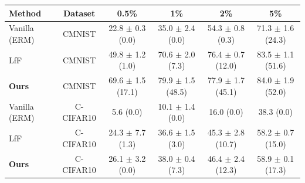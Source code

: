 \begin{tabular}{lccccc}
\toprule
Method & Dataset & 0.5\% & 1\% & 2\% & 5\% \\
\midrule
Vanilla (ERM) & CMNIST & 22.8 $\pm$ 0.3 (0.0) & 35.0 $\pm$ 2.4 (0.0) & 54.3 $\pm$ 0.8 (0.3) & 71.3 $\pm$ 1.6 (24.3) \\
LfF & CMNIST & 49.8 $\pm$ 1.2 (1.0) & 70.6 $\pm$ 2.0 (7.3) & 76.4 $\pm$ 0.7 (12.0) & 83.5 $\pm$ 1.1 (51.6) \\
\textbf{Ours} & CMNIST & 69.6 $\pm$ 1.5 (17.1) & 79.9 $\pm$ 1.5 (48.5) & 77.9 $\pm$ 1.7 (45.1) & 84.0 $\pm$ 1.9 (52.0) \\
Vanilla (ERM) & C-CIFAR10 & 5.6 (0.0) & 10.1 $\pm$ 1.4 (0.0) & 16.0 (0.0) & 38.3 (0.0) \\
LfF & C-CIFAR10 & 24.3 $\pm$ 7.7 (1.3) & 36.6 $\pm$ 1.5 (3.0) & 45.3 $\pm$ 2.8 (10.7) & 58.2 $\pm$ 0.7 (15.0) \\
\textbf{Ours} & C-CIFAR10 & 26.1 $\pm$ 3.2 (0.0) & 38.0 $\pm$ 0.4 (7.3) & 46.4 $\pm$ 2.4 (12.3) & 58.9 $\pm$ 0.1 (17.3) \\
\bottomrule
\end{tabular}
